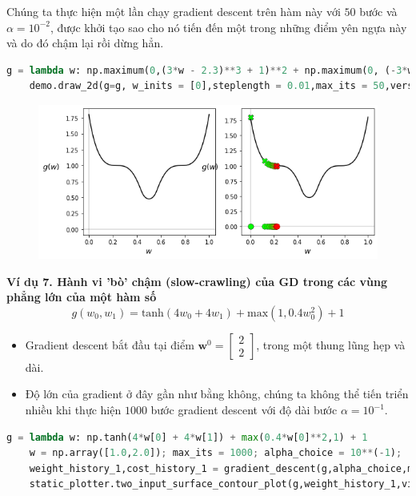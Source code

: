 \documentclass{book}
\begin{document}
Chúng ta thực hiện một lần chạy gradient descent trên hàm này với $50$ bước và $\alpha = 10^{-2}$, được khởi tạo sao cho nó tiến đến một trong những điểm yên ngựa này và do đó chậm lại rồi dừng hẳn. 
\begin{lstlisting}[language=python]
    g = lambda w: np.maximum(0,(3*w - 2.3)**3 + 1)**2 + np.maximum(0, (-3*w + 0.7)**3 + 1)**2
    demo.draw_2d(g=g, w_inits = [0],steplength = 0.01,max_its = 50,version = 'unnormalized',wmin = 0,wmax = 1.0)
\end{lstlisting}
\begin{figure}[H]
    \centering
    \includegraphics[width=\textwidth]{images/slow_crawling_behaviour_saddle_point.png}
\end{figure}
\textbf{Ví dụ 7. Hành vi 'bò' chậm (slow-crawling) của GD trong các vùng phẳng lớn của một hàm số}
\begin{equation*}
    g(w_0,w_1) = \text{tanh}(4w_0 + 4w_1) + \text{max}(1,0.4w_0^2) + 1
\end{equation*}
\begin{itemize}
    \item Gradient descent bắt đầu tại điểm $\mathbf{w}^0 = \begin{bmatrix} 2 \\ 2 \end{bmatrix}$, trong một thung lũng hẹp và dài.
    \item Độ lớn của gradient ở đây gần như bằng không, chúng ta không thể tiến triển nhiều khi thực hiện $1000$ bước gradient descent với độ dài bước $\alpha = 10^{-1}$.
\end{itemize}
\begin{lstlisting}[language=python]
    g = lambda w: np.tanh(4*w[0] + 4*w[1]) + max(0.4*w[0]**2,1) + 1
    w = np.array([1.0,2.0]); max_its = 1000; alpha_choice = 10**(-1);
    weight_history_1,cost_history_1 = gradient_descent(g,alpha_choice,max_its,w)
    static_plotter.two_input_surface_contour_plot(g,weight_history_1,view = [20,300],num_contours = 20,xmin = -3,xmax = 3,ymin = -5,ymax = 3)
\end{lstlisting}
\end{document}
